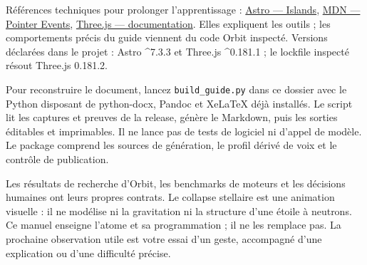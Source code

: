 \documentclass[
  canadien,
  11pt,
  letterpaper,
]{article}
\begin{document}
Références techniques pour prolonger l'apprentissage :
\href{https://docs.astro.build/en/concepts/islands/}{Astro --- Islands},
\href{https://developer.mozilla.org/en-US/docs/Web/API/Pointer_events}{MDN
--- Pointer Events}, \href{https://threejs.org/docs/}{Three.js ---
documentation}. Elles expliquent les outils ; les comportements précis
du guide viennent du code Orbit inspecté. Versions déclarées dans le
projet : Astro \^{}7.3.3 et Three.js \^{}0.181.1 ; le lockfile inspecté
résout Three.js 0.181.2.

Pour reconstruire le document, lancez \texttt{build\_guide.py} dans ce
dossier avec le Python disposant de python-docx, Pandoc et XeLaTeX déjà
installés. Le script lit les captures et preuves de la release, génère
le Markdown, puis les sorties éditables et imprimables. Il ne lance pas
de tests de logiciel ni d'appel de modèle. Le package comprend les
sources de génération, le profil dérivé de voix et le contrôle de
publication.

Les résultats de recherche d'Orbit, les benchmarks de moteurs et les
décisions humaines ont leurs propres contrats. Le collapse stellaire est
une animation visuelle : il ne modélise ni la gravitation ni la
structure d'une étoile à neutrons. Ce manuel enseigne l'atome et sa
programmation ; il ne les remplace pas. La prochaine observation utile
est votre essai d'un geste, accompagné d'une explication ou d'une
difficulté précise.
\end{document}
